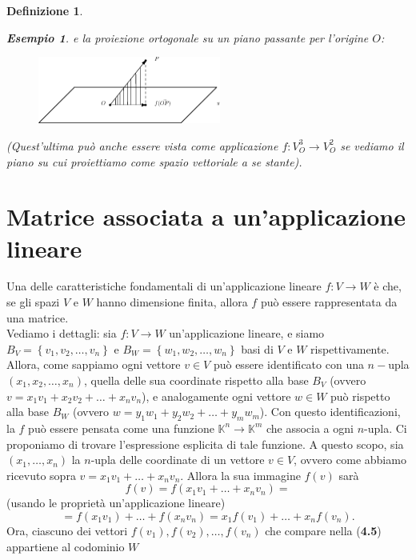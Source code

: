 \documentclass{book}
\newtheorem{definizione}{Definizione}
\newtheorem{esempio}{Esempio}
\begin{document}
\begin{definizione}
\begin{esempio}
    e la proiezione ortogonale su un piano passante per l'origine $O$:
    \begin{figure}[th]
      \centering
        \includegraphics[width=6cm]{img/finiti/imgex4-2-10.eps}
    \end{figure}
    (Quest'ultima può anche essere vista come applicazione $f:V_O^3\to V_O^2$ se vediamo il piano su cui
    proiettiamo come spazio vettoriale a se stante).
  \end{esempio}
\end{definizione}

\section{Matrice associata a un'applicazione lineare}
Una delle caratteristiche fondamentali di un'applicazione lineare $f:V\to W$ è che, se gli spazi $V$ e $W$ hanno
dimensione finita, allora $f$ può essere rappresentata da una matrice.\\ Vediamo i dettagli: sia $f:V\to W$
un'applicazione lineare, e siamo $B_V=\left\{v_1,v_2,\dots,v_n\right\}$ e $B_W=\left\{w_1,w_2,\dots,w_n\right\}$
basi di $V$ e $W$ rispettivamente. Allora, come sappiamo ogni vettore $v\in V$ può essere identificato con una
$n-$upla $\left(x_1,x_2,\dots,x_n\right)$, quella delle sua coordinate rispetto alla base $B_V$ (ovvero
$v=x_1v_1+x_2v_2+\dots+x_nv_n$), e analogamente ogni vettore $w\in W$ può rispetto alla base $B_W$ (ovvero
$w=y_1w_1+y_2w_2+\dots+y_mw_m$). Con questo identificazioni, la $f$ può essere pensata come una funzione
$\mathds{K}^n\to\mathds{K}^m$ che associa a ogni $n$-upla. Ci proponiamo di trovare l'espressione esplicita di
tale funzione. A questo scopo, sia $(x_1,\dots,x_n)$ la $n$-upla delle coordinate di un vettore $v\in V$, ovvero
come abbiamo ricevuto sopra $v=x_1v_1+\dots+x_nv_n$. Allora la sua immagine $f(v)$ sarà
\begin{equation*}
  f(v)=f(x_1v_1+\dots+x_nv_n) =
\end{equation*}
(usando le proprietà un'applicazione lineare)
\begin{equation}
  =f(x_1v_1)+\dots+f(x_nv_n)=x_1f(v_1)+\dots+x_nf(v_n).
\end{equation}
Ora, ciascuno dei vettori $f(v_1),f(v_2),\dots,f(v_n)$ che compare nella ({\bf 4.5}) appartiene al codominio $W$
\end{document}
